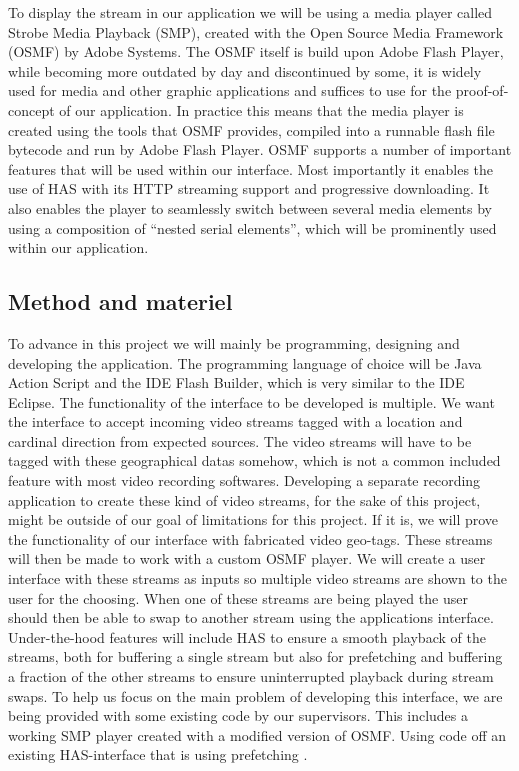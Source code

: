 \documentclass[9pt,a4paper]{acmproc}
\begin{document}
To display the stream in our application we will be using a media player called Strobe Media Playback (SMP), created with the Open Source Media Framework (OSMF) by Adobe Systems. The OSMF itself is build upon Adobe Flash Player, while becoming more outdated by day and discontinued by some, it is widely used for media and other graphic applications and suffices to use for the proof-of-concept of our application. In practice this means that the media player is created using the tools that OSMF provides, compiled into a runnable flash file bytecode and run by Adobe Flash Player. 
OSMF supports a number of important features that will be used within our interface. Most importantly it enables the use of HAS with its HTTP streaming support and progressive downloading. It also enables the player to seamlessly switch between several media elements by using a composition of “nested serial elements”, which will be prominently used within our application.\cite{osmf}

\subsection{Method and materiel}
To advance in this project we will mainly be programming, designing and developing the application. The programming language of choice will be Java Action Script and the IDE Flash Builder, which is very similar to the IDE Eclipse. The functionality of the interface to be developed is multiple. We want the interface to accept incoming video streams tagged with a location and cardinal direction from expected sources. The video streams will have to be tagged with these geographical datas somehow, which is not a common included feature with most video recording softwares. Developing a separate recording application to create these kind of video streams, for the sake of this project, might be outside of our goal of limitations for this project. If it is, we will prove the functionality of our interface with fabricated video geo-tags. These streams will then be made to work with a custom OSMF player. We will create a user interface with these streams as inputs so multiple video streams are shown to the user for the choosing. When one of these streams are being played the user should then be able to swap to another stream using the applications interface. Under-the-hood features will include HAS to ensure a smooth playback of the streams, both for buffering a single stream but also for prefetching and buffering a fraction of the other streams to ensure uninterrupted playback during stream swaps. To help us focus on the main problem of developing this interface, we are being provided with some existing code by our supervisors. This includes a working SMP player created with a modified version of OSMF. Using code off an existing HAS-interface that is using prefetching \cite{qualbranch}.
\end{document}
